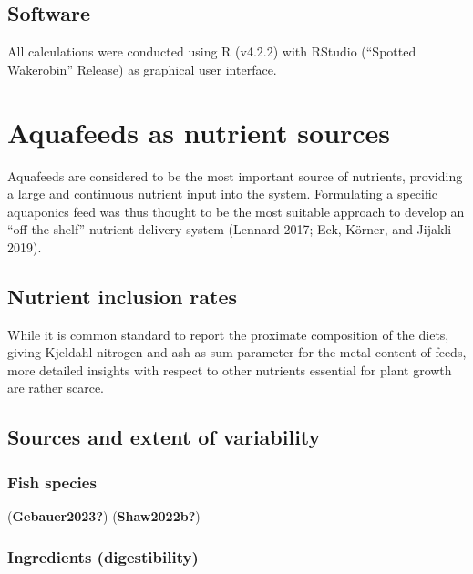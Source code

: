 \documentclass[preprint, 3p,
authoryear]{elsarticle} %
\begin{document}
\hypertarget{software}{%
\subsection{Software}\label{software}}

All calculations were conducted using R (v4.2.2) with RStudio (``Spotted
Wakerobin'' Release) as graphical user interface.

\hypertarget{aquafeeds-as-nutrient-sources}{%
\section{Aquafeeds as nutrient
sources}\label{aquafeeds-as-nutrient-sources}}

Aquafeeds are considered to be the most important source of nutrients,
providing a large and continuous nutrient input into the system.
Formulating a specific aquaponics feed was thus thought to be the most
suitable approach to develop an ``off-the-shelf'' nutrient delivery
system (Lennard 2017; Eck, Körner, and Jijakli 2019).

\hypertarget{nutrient-inclusion-rates}{%
\subsection{Nutrient inclusion rates}\label{nutrient-inclusion-rates}}

While it is common standard to report the proximate composition of the
diets, giving Kjeldahl nitrogen and ash as sum parameter for the metal
content of feeds, more detailed insights with respect to other nutrients
essential for plant growth are rather scarce.

\hypertarget{sources-and-extent-of-variability}{%
\subsection{Sources and extent of
variability}\label{sources-and-extent-of-variability}}

\hypertarget{fish-species}{%
\subsubsection{Fish species}\label{fish-species}}

(\textbf{Gebauer2023?}) (\textbf{Shaw2022b?})

\hypertarget{ingredients-digestibility}{%
\subsubsection{Ingredients
(digestibility)}\label{ingredients-digestibility}}
\end{document}
